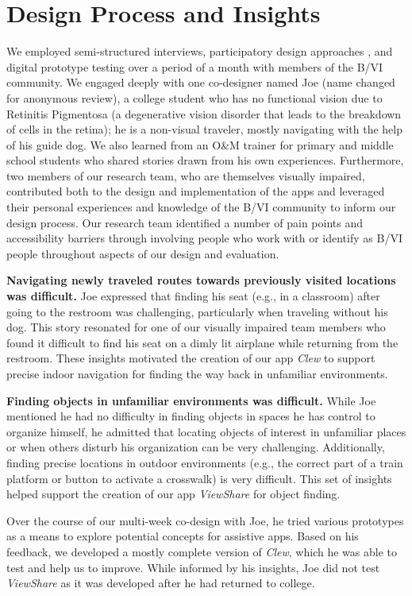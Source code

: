 \documentclass[chi_draft]{sigchi}
\newcommand{\BVI}{B/VI\xspace}
\newcommand{\OM}{O\&M\xspace}
\begin{document}
\section{Design Process and Insights}
We employed semi-structured interviews, participatory design approaches \cite{buhler2001empowered, schuler1993participatory}, and digital prototype testing over a period of a month with members of the \BVI community.  We engaged deeply with one co-designer named Joe (name changed for anonymous review), a college student who has no functional vision due to Retinitis Pigmentosa (a degenerative vision disorder that leads to the breakdown of cells in the retina); he is a non-visual traveler, mostly navigating with the help of his guide dog. We also learned from an \OM trainer for primary and middle school students who shared stories drawn from his own experiences. Furthermore, two members of our research team, who are themselves visually impaired, contributed both to the design and implementation of the apps and leveraged their personal experiences and knowledge of the \BVI community to inform our design process. Our research team identified a number of pain points and accessibility barriers through involving people who work with or identify as \BVI people throughout aspects of our design and evaluation.

\textbf{Navigating newly traveled routes towards previously visited locations was difficult.} Joe expressed that finding his seat (e.g., in a classroom) after going to the restroom was challenging, particularly when traveling without his dog. This story resonated for one of our visually impaired team members who found it difficult to find his seat on a dimly lit airplane while returning from the restroom. These insights motivated the creation of our app \emph{Clew} to support precise indoor navigation for finding the way back in unfamiliar environments.

\textbf{Finding objects in unfamiliar environments was difficult.} While Joe mentioned he had no difficulty in finding objects in spaces he has control to organize himself, he admitted that locating objects of interest in unfamiliar places or when others disturb his organization can be very challenging. Additionally, finding precise locations in outdoor environments (e.g., the correct part of a train platform or button to activate a crosswalk) is very difficult.  This set of insights helped support the creation of our app \emph{ViewShare} for object finding.

Over the course of our multi-week co-design with Joe, he tried various prototypes as a means to explore potential concepts for assistive apps.  Based on his feedback, we developed a mostly complete version of \emph{Clew}, which he was able to test and help us to improve.  While informed by his insights, Joe did not test \emph{ViewShare} as it was developed after he had returned to college.
\end{document}
